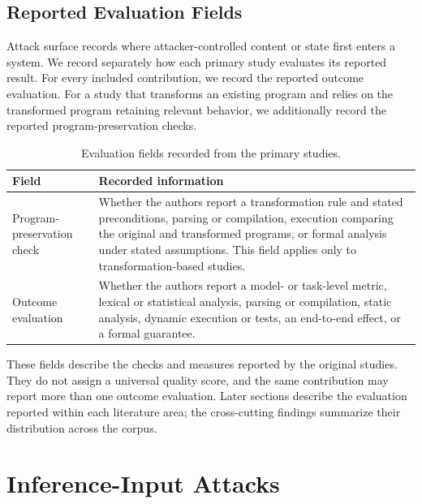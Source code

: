\documentclass[acmsmall,screen,review]{acmart}
\begin{document}
\subsection{Reported Evaluation Fields}
\label{sec:reported-evaluation}

Attack surface records where attacker-controlled content or state first enters a system. We record separately how each primary study evaluates its reported result. For every included contribution, we record the reported outcome evaluation. For a study that transforms an existing program and relies on the transformed program retaining relevant behavior, we additionally record the reported program-preservation checks.

\begin{table}[t]
\centering
\caption{Evaluation fields recorded from the primary studies.}
\label{tab:reported-evaluation-fields}
\begin{tabularx}{\columnwidth}{@{}L{2.65cm}Y@{}}
\toprule
\textbf{Field} & \textbf{Recorded information} \\
\midrule
Program-preservation check &
Whether the authors report a transformation rule and stated preconditions, parsing or compilation, execution comparing the original and transformed programs, or formal analysis under stated assumptions. This field applies only to transformation-based studies. \\
\midrule
Outcome evaluation &
Whether the authors report a model- or task-level metric, lexical or statistical analysis, parsing or compilation, static analysis, dynamic execution or tests, an end-to-end effect, or a formal guarantee. \\
\bottomrule
\end{tabularx}
\end{table}

These fields describe the checks and measures reported by the original studies. They do not assign a universal quality score, and the same contribution may report more than one outcome evaluation. Later sections describe the evaluation reported within each literature area; the cross-cutting findings summarize their distribution across the corpus.


\section{Inference-Input Attacks}
\label{sec:evasion}
\end{document}
